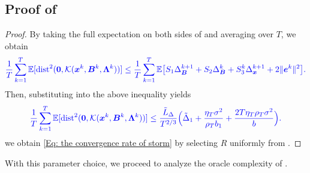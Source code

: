 \subsection{Proof of }
\label{app:storm-rate-proof}
\begin{proof}
    By taking the full expectation on both sides of  and averaging over $T$, we obtain
    \[
        {\color{blue}\frac1T\sum\limits_{k=1}^{T}\mathbb{E}[\mathrm{dist}^{2}(\bm{0},\mathcal K(\bm{x}^k,\bm{B}^k,\bm{\Lambda}^k))]
        \leq\frac1T\sum\limits_{k=1}^{T}\mathbb{E}\bigl[S_1\Delta_{\bm{B}}^{k+1}+S_2\Delta_{\bm{B}}^{k}+S_3^k\Delta_{\bm{x}}^{k+1}+2\|\bm{e}^{k}\|^{2}\bigr].}
    \]
     Then, substituting  into the above inequality yields
    \[
        {\color{blue}\frac1T\sum\limits_{k=1}^{T}\mathbb{E}[\mathrm{dist}^{2}(\bm{0},\mathcal K(\bm{x}^k,\bm{B}^k,\bm{\Lambda}^k))]
        \leq\frac{\tilde{L}_{\Delta}}{T^{2/3}}\Bigl(\tilde\Delta_1+\frac{\eta_T\sigma^2}{\rho_Tb_1}+\frac{2T\eta_T\rho_T\sigma^2}{b}\Bigr).}
    \]
     we obtain \eqref{Eq: the convergence rate of storm} by selecting $R$ uniformly from .
\end{proof}
With this parameter choice, we proceed to analyze the oracle complexity of .
